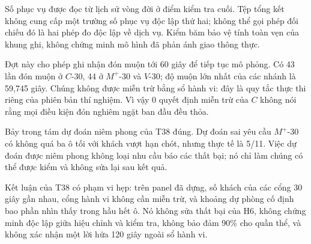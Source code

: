 Số phục vụ được đọc từ lịch sử vòng đời ở điểm kiểm tra cuối. Tệp tổng kết
không cung cấp một trường số phục vụ độc lập thứ hai; không thể gọi phép
đối chiếu đó là hai phép đo độc lập về dịch vụ. Kiểm băm bảo vệ tính toàn
vẹn của khung ghi, không chứng minh mô hình đã phản ánh giao thông thực.

Đợt này cho phép ghi nhận đón muộn tới 60 giây để tiếp tục mô phỏng. Có 43
lần đón muộn ở $C$-30, 44 ở $M^{+}$-30 và $V$-30; độ muộn lớn nhất của
các nhánh là 59,745 giây. Chúng không được miễn trừ bằng sổ hành vi: đây là
quy tắc thực thi riêng của phiên bản thí nghiệm. Vì vậy 0 quyết định miễn
trừ của $C$ không nói rằng mọi điều kiện đón nghiêm ngặt ban đầu đều thỏa.

Bảy trong tám dự đoán niêm phong của T38 đúng. Dự đoán sai yêu cầu
$M^{+}$-30 có không quá ba ô tối với khách vượt hạn chót, nhưng thực tế là
5/11. Việc dự đoán được niêm phong không loại nhu cầu báo các thất bại;
nó chỉ làm chúng có thể được kiểm và không sửa lại sau kết quả.

Kết luận của T38 có phạm vi hẹp: trên panel đã dựng, số khách của các cổng
30 giây gần nhau, cổng hành vi không cần miễn trừ, và khoảng dự phòng cố
định bao phần nhìn thấy trong hầu hết ô. Nó không sửa thất bại của H6,
không chứng minh độc lập giữa hiệu chỉnh và kiểm tra, không bảo đảm 90\%
cho quần thể, và không xác nhận một lời hứa 120 giây ngoài sổ hành vi.
